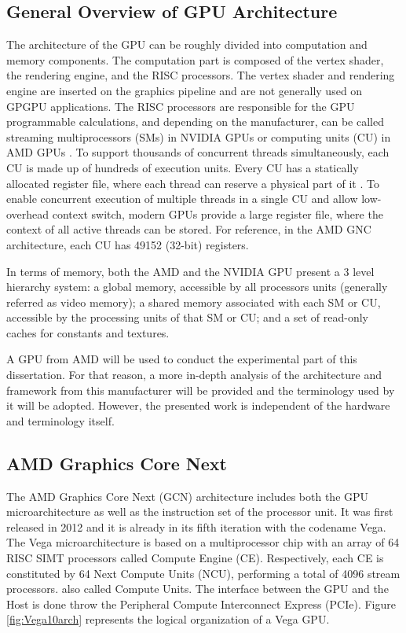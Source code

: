 \subsection{General Overview of GPU Architecture}
The architecture of the GPU can be roughly divided into computation and memory components. The computation part is composed of the vertex shader, the rendering engine, and the RISC processors. The vertex shader and rendering engine are inserted on the graphics pipeline and are not generally used on GPGPU applications. The RISC processors are responsible for the GPU programmable calculations, and depending on the manufacturer, can be called streaming multiprocessors (SMs) in NVIDIA GPUs \cite{nvidia_cuda_nodate} or computing units (CU) in AMD GPUs \cite{amd_amd_nodate}. To support thousands of concurrent threads simultaneously, each CU is made up of hundreds of execution units. Every CU has a statically allocated register file, where each thread can reserve a physical part of it \cite{jing_energy-efficient_2013}. To enable concurrent execution of multiple threads in a single CU and allow low-overhead context switch, modern GPUs provide a large register file, where the context of all active threads can be stored. For reference, in the AMD GNC architecture, each CU has 49152 (32-bit) registers.

In terms of memory, both the AMD and the NVIDIA GPU present a 3 level hierarchy system: a global memory, accessible by all processors units (generally referred as video memory); a shared memory associated with each SM or CU, accessible by the processing units of that SM or CU; and a set of read-only caches for constants and textures.

A GPU from AMD will be used to conduct the experimental part of this dissertation. For that reason, a more in-depth analysis of the architecture and framework from this manufacturer will be provided and the terminology used by it will be adopted. However, the presented work is independent of the hardware and terminology itself.

\subsection{AMD Graphics Core Next}

The AMD Graphics Core Next (GCN) \cite{amd_radeons_nodate}  architecture includes both the GPU microarchitecture as well as the instruction set of the processor unit. It was first released in 2012 and it is already in its fifth iteration with the codename Vega. The Vega microarchitecture is based on a multiprocessor chip with an array of 64 RISC SIMT processors called Compute Engine (CE). Respectively, each CE is constituted by 64 Next Compute Units (NCU), performing a total of 4096 stream processors. also called Compute Units. The interface between the GPU and the Host is done throw the Peripheral Compute Interconnect Express (PCIe). Figure \ref{fig:Vega10arch} represents the logical organization of a Vega GPU. 

